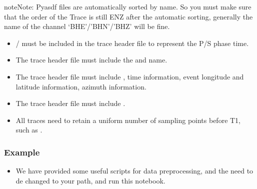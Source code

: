 \documentclass[a4paper,10pt,english,openany]{sphinxmanual}
\begin{document}
\begin{sphinxadmonition}{note}{Note:}
Pyasdf files are automatically sorted by name. So you must make sure that the order of the Trace
is still ENZ after the automatic sorting, generally the name of the channel  ‘BHE’/’BHN’/’BHZ’ will be fine.
\end{sphinxadmonition}
\begin{itemize}
\item {} 
/ must be included in the trace header file to represent the P/S phase time.

\item {} 
The trace header file must include the  and  name.

\item {} 
The trace header file must include , time information,
event longitude and latitude information, azimuth information.

\item {} 
The trace header file must include .

\item {} 
All traces need to retain a uniform number of sampling points before T1, such as .

\end{itemize}


\subsubsection{Example}
\label{\detokenize{tutorials/S3_Process_Data:example}}\begin{itemize}
\item {} 
We have provided some useful scripts for data preprocessing, and the  need to de changed to your path,
and run this notebook.

\end{itemize}
\end{document}
